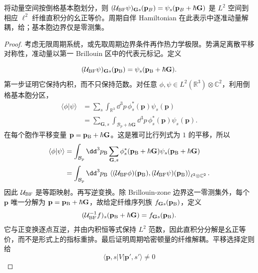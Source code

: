 \begin{theorem}
将动量空间按倒格基本胞划分，则 $(\mathcal U_{\rm BF}\psi)_{\mathbf Gs}(\mathbf p_B)=\psi_s(\mathbf p_B+\hbar\mathbf G)$ 是 $L^2$ 空间到相应 $\ell^2$ 纤维直积分的幺正等价。周期自伴 Hamiltonian 在此表示中逐准动量解耦，给；基本胞边界仅是零测集。
\end{theorem}
\begin{proof}
考虑无限周期系统，或先取周期边界条件再作热力学极限。势满足离散平移对称性，准动量以第一 Brillouin 区中的代表元标记。定义

\begin{equation*}
(\mathcal U_{\rm BF}\psi)_{\mathbf Gs}(\mathbf p_{\rm B})
=\psi_s(\mathbf p_{\rm B}+\hbar\mathbf G).
\end{equation*}
第一步证明它保持内积，而不只保持范数。对任意 $\phi,\psi\in L^2(\mathbb R^3)\otimes\mathbb C^2$，利用倒格基本胞分区，
\begin{align*}
\langle\phi|\psi\rangle
&=\sum_s\int_{\mathbb R^3}\dd^3 p\,
\phi_s^*(\mathbf p)\psi_s(\mathbf p)\\
&=\sum_{\mathbf G,s}
\int_{\mathcal B_p+\hbar\mathbf G}\dd^3 p\,
\phi_s^*(\mathbf p)\psi_s(\mathbf p).
\end{align*}
在每个胞作平移变量
$\mathbf p=\mathbf p_{\rm B}+\hbar\mathbf G$。这是雅可比行列式为 $1$ 的平移，所以
\begin{align*}
\langle\phi|\psi\rangle
&=\int_{\mathcal B_p}\dd^3 p_{\rm B}
\sum_{\mathbf G,s}
\phi_s^*(\mathbf p_{\rm B}+\hbar\mathbf G)
\psi_s(\mathbf p_{\rm B}+\hbar\mathbf G)\\
&=\int_{\mathcal B_p}\dd^3 p_{\rm B}\,
\left\langle
(\mathcal U_{\rm BF}\phi)(\mathbf p_{\rm B}),
(\mathcal U_{\rm BF}\psi)(\mathbf p_{\rm B})
\right\rangle_{\ell^2\otimes\mathbb C^2}.
\end{align*}
因此 $\mathcal U_{\rm BF}$ 是等距映射。再写逆变换。除 Brillouin-zone 边界这一零测集外，每个 $\mathbf p$ 唯一分解为
$\mathbf p=\mathbf p_{\rm B}+\hbar\mathbf G$，故给定纤维序列族 $f_{\mathbf Gs}(\mathbf p_{\rm B})$，定义
\begin{equation*}
(\mathcal U_{\rm BF}^{-1}f)_s(\mathbf p_{\rm B}+\hbar\mathbf G)
=f_{\mathbf Gs}(\mathbf p_{\rm B}).
\end{equation*}
它与正变换逐点互逆，并由内积恒等式保持 $L^2$ 范数，因此直积分分解是幺正等价，而不是形式上的指标重排。最后证明周期哈密顿量的纤维解耦。平移选择定则给
\begin{equation*}
\langle\mathbf p,s|V|\mathbf p',s'\rangle\ne0

\end{equation*}
\end{proof}
